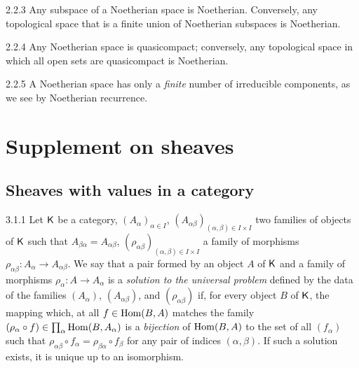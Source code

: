 \documentclass[10pt,oneside]{book}
\begin{document}
\begin{env}{2.2.3}
\label{env-0.2.2.3}
Any subspace of a Noetherian space is Noetherian. Conversely, any topological space that is a
finite union of Noetherian subspaces is Noetherian.
\end{env}

\begin{env}{2.2.4}
\label{env-0.2.2.4}
Any Noetherian space is quasicompact; conversely, any  topological space in which all open
sets are quasicompact is Noetherian.
\end{env}

\begin{env}{2.2.5}
\label{env-0.2.2.5}
A Noetherian space has only a \emph{finite} number of irreducible components, as we see by
Noetherian recurrence.
\end{env}

\section{Supplement on sheaves}
\label{0-prelim-3}

\subsection{Sheaves with values in a category}
\label{0-prelim-3.1}

\begin{env}{3.1.1}
\label{env-0.3.1.1}
Let $\mathsf{K}$ be a category, $(A_\alpha)_{\alpha\in I}$,
$(A_{\alpha\beta})_{(\alpha,\beta)\in I\times I}$ two families of objects of $\mathsf{K}$ such that
$A_{\beta\alpha}=A_{\alpha\beta}$, $(\rho_{\alpha\beta})_{(\alpha,\beta)\in I\times I}$ a
family of morphisms $\rho_{\alpha\beta}:A_\alpha\to A_{\alpha\beta}$. We say that a pair
formed by an object $A$ of $\mathsf{K}$ and a family of morphisms $\rho_\alpha:A\to A_\alpha$  is a
\emph{solution to the universal problem} defined by the data of the families $(A_\alpha)$,
$(A_{\alpha\beta})$, and $(\rho_{\alpha\beta})$ if, for every object $B$ of $\mathsf{K}$, the mapping
which, at all $f\in{\mathop{\mathrm{Hom}}\nolimits}(B,A)$ matches the family
$(\rho_\alpha\circ f)\in\prod_\alpha{\mathop{\mathrm{Hom}}\nolimits}(B,A_\alpha)$ is a \emph{bijection} of ${\mathop{\mathrm{Hom}}\nolimits}(B,A)$ to
the set of all $(f_\alpha)$ such that
$\rho_{\alpha\beta}\circ f_\alpha=\rho_{\beta\alpha}\circ f_\beta$ for any pair of indices
$(\alpha,\beta)$. If such a solution exists, it is unique up to an isomorphism.
\end{env}
\end{document}
